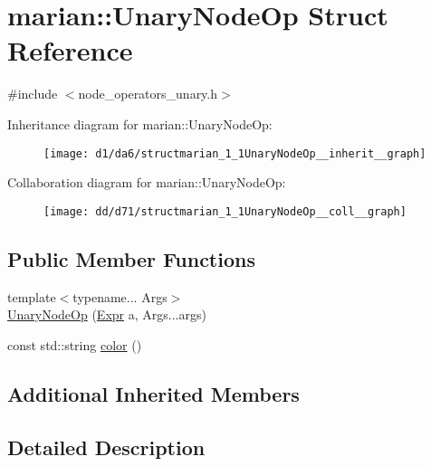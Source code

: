 \hypertarget{structmarian_1_1UnaryNodeOp}{}\section{marian\+:\+:Unary\+Node\+Op Struct Reference}
\label{structmarian_1_1UnaryNodeOp}


{\ttfamily \#include $<$node\+\_\+operators\+\_\+unary.\+h$>$}



Inheritance diagram for marian\+:\+:Unary\+Node\+Op\+:
\nopagebreak
\begin{figure}[H]
\begin{center}
\leavevmode
\texttt{[image: d1/da6/structmarian\_1\_1UnaryNodeOp\_\_inherit\_\_graph]}
\end{center}
\end{figure}


Collaboration diagram for marian\+:\+:Unary\+Node\+Op\+:
\nopagebreak
\begin{figure}[H]
\begin{center}
\leavevmode
\texttt{[image: dd/d71/structmarian\_1\_1UnaryNodeOp\_\_coll\_\_graph]}
\end{center}
\end{figure}
\subsection*{Public Member Functions}
\begin{DoxyCompactItemize}
\item 
{\footnotesize template$<$typename... Args$>$ }\\\hyperlink{structmarian_1_1UnaryNodeOp_af4481274a5a2cf72328c7cdffeb5f571}{Unary\+Node\+Op} (\hyperlink{namespacemarian_a498d8baf75b754011078b890b39c8e12}{Expr} a, Args...\+args)
\item 
const std\+::string \hyperlink{structmarian_1_1UnaryNodeOp_a826c7c1d74e47f70040cd1884b8ab984}{color} ()
\end{DoxyCompactItemize}
\subsection*{Additional Inherited Members}


\subsection{Detailed Description}


